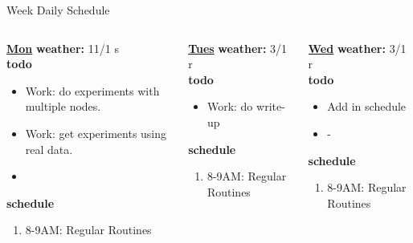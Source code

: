 \begin{columns}
\begin{column}{0.333\columnwidth}
\begin{columns}
\begin{column}{0.6\linewidth}
\begin{block}{Week Daily Schedule}
        \begin{columns}
          \begin{column}{0.14\textwidth}{\small \underline{\bf Mon}}
            {\tiny \bf {\tiny weather:} } {\tiny 11/1 s} \\ 
            {\tiny \bf {\tiny todo}}\\ 
            \begin{itemize}
              \tiny \item \tiny Work: do experiments with multiple
              nodes. 
            \item \tiny Work: get experiments using real data.  
            \item \tiny 
            \end{itemize}
                {\small  \bf schedule}\\
                \begin{enumerate} 
                  \tiny \item \tiny 8-9AM: Regular Routines 
                \end{enumerate}
          \end{column}

          \begin{column}{0.14\textwidth}{\small \underline{\bf Tues}}
            {\bf {\tiny  weather:} } {\tiny 3/1 r} \\ 
            {\bf {\tiny todo}}\\ 
            \begin{itemize}
              \tiny \item \tiny Work: do write-up  
            \end{itemize} 
                {{\bf {\tiny  schedule}}}
                \begin{enumerate} 
                  \tiny \item \tiny 8-9AM: Regular Routines 
                \end{enumerate} 
          \end{column}

          \begin{column}{0.14\textwidth}{\small \underline{\bf Wed}}
            {\tiny \bf weather: } {\tiny 3/1 r} \\ 
            {\tiny {\bf todo}}\\
            \begin{itemize}
              \tiny \item \tiny Add in schedule
            \item \tiny -
            \end{itemize} 
                {\tiny \bf schedule}\\
                \begin{enumerate} 
                  \tiny \item \tiny 8-9AM: Regular Routines 
                \end{enumerate} 
          \end{column}


\end{columns}
\end{block}
\end{column}
\end{columns}
\end{column}
\end{columns}
